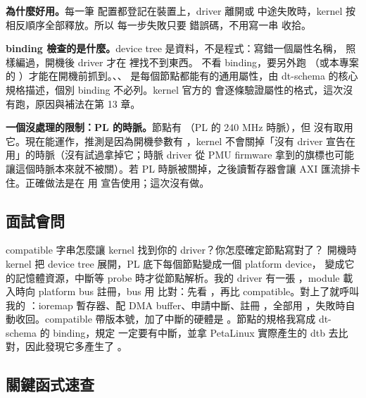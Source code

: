 \textbf{ 為什麼好用。}每一筆  配置都登記在裝置上，driver 離開或  中途失敗時，kernel 按相反順序全部釋放。所以  每一步失敗只要  錯誤碼，不用寫一串  收拾。

\textbf{binding 檢查的是什麼。}device tree 是資料，不是程式：寫錯一個屬性名稱， 照樣編過，開機後 driver 才在  裡找不到東西。 不看 binding，要另外跑 （或本專案的 ）才能在開機前抓到。、、 是每個節點都能有的通用屬性，由 dt-schema 的核心規格描述，個別 binding 不必列。kernel 官方的  會逐條驗證屬性的格式，這次沒有跑，原因與補法在第 13 章。

\textbf{一個沒處理的限制：PL 的時脈。}節點有 （PL 的 240 MHz 時脈），但  沒有取用它。現在能運作，推測是因為開機參數有 ，kernel 不會關掉「沒有 driver 宣告在用」的時脈（沒有試過拿掉它；時脈 driver 從 PMU firmware 拿到的旗標也可能讓這個時脈本來就不被關）。若 PL 時脈被關掉，之後讀暫存器會讓 AXI 匯流排卡住。正確做法是在  用  宣告使用；這次沒有做。

\subsection{面試會問}

\begin{qa}{compatible 字串怎麼讓 kernel 找到你的 driver？你怎麼確定節點寫對了？}
開機時 kernel 把 device tree 展開，PL 底下每個節點變成一個 platform device， 變成它的記憶體資源，中斷等 probe 時才從節點解析。我的 driver 有一張 ，module 載入時向 platform bus 註冊，bus 用  比對：先看 ，再比 compatible。對上了就呼叫我的 ：ioremap 暫存器、配 DMA buffer、申請中斷、註冊 ，全部用 ，失敗時自動收回。compatible 帶版本號，加了中斷的硬體是 。節點的規格我寫成 dt-schema 的 binding，規定  一定要有中斷，並拿 PetaLinux 實際產生的 dtb 去比對，因此發現它多產生了 。
\end{qa}

\subsection{關鍵函式速查}

